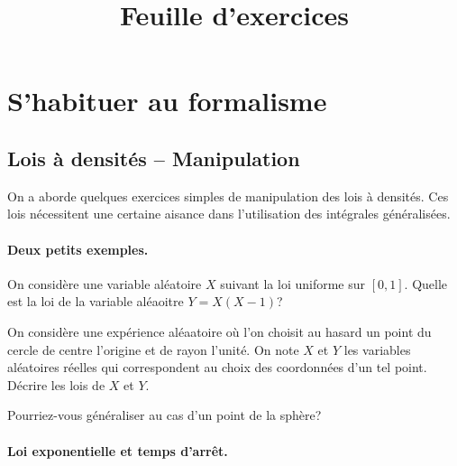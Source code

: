 \documentclass[11pt, a4paper]{article}
\title{%
  { \huge Feuille d'exercices}%
}
\author{}
\date{}
\begin{document}
\maketitle\thispagestyle{fancy}

\section{S'habituer au formalisme}
\label{sec:formalisme}


\subsection{Lois à densités -- Manipulation}

\noindent On a aborde quelques exercices simples de manipulation des lois à
densités. Ces lois nécessitent une certaine aisance dans l'utilisation
des intégrales généralisées.

\paragraph{Deux petits exemples.}

\begin{question}
  On considère une variable aléatoire $X$ suivant la loi uniforme sur
  $[0, 1]$. Quelle est la loi de la variable aléaoitre $Y = X(X-1)$?
\end{question}

\begin{question}
  On considère une expérience aléaatoire où l'on choisit au hasard un
  point du cercle de centre l'origine et de rayon l'unité. On note $X$
  et $Y$ les variables aléatoires réelles qui correspondent au choix
  des coordonnées d'un tel point. Décrire les lois de $X$ et $Y$.

  Pourriez-vous généraliser au cas d'un point de la sphère?
\end{question}

\paragraph{Loi exponentielle et temps d'arrêt.}
\end{document}
